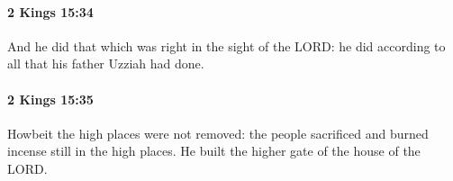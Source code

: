 		\paragraph{2 Kings 15:34} %
			\label{2KINGS-15-34}

			And he did that which was right in the sight of the LORD: he did according to all that his father Uzziah had done.


		\paragraph{2 Kings 15:35} %
			\label{2KINGS-15-35}

			Howbeit the high places were not removed: the people sacrificed and burned incense still in the high places. He built the higher gate of the house of the LORD.


